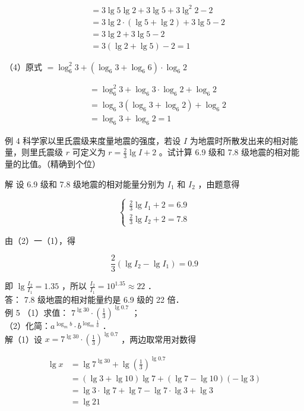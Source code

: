 \documentclass[10pt]{article}
\begin{document}
\[
\begin{aligned}
& =3 \lg 5 \lg 2+3 \lg 5+3 \lg ^{2} 2-2 \\
& =3 \lg 2 \cdot(\lg 5+\lg 2)+3 \lg 5-2 \\
& =3 \lg 2+3 \lg 5-2 \\
& =3(\lg 2+\lg 5)-2=1
\end{aligned}
\]

（4）原式 \(=\log _{6}^{2} 3+\left(\log _{6} 3+\log _{6} 6\right) \cdot \log _{6} 2\)

\[
\begin{aligned}
& =\log _{6}^{2} 3+\log _{6} 3 \cdot \log _{6} 2+\log _{6} 2 \\
& =\log _{6} 3\left(\log _{6} 3+\log _{6} 2\right)+\log _{6} 2 \\
& =\log _{6} 3+\log _{6} 2=1
\end{aligned}
\]

例 4 科学家以里氏震级来度量地震的强度，若设 \(I\) 为地震时所散发出来的相对能量，则里氏震级 \(r\) 可定义为 \(r=\frac{2}{3} \lg I+2\) 。试计算 6.9 级和 7.8 级地震的相对能量的比值。（精确到个位）

解 设 6.9 级和 7.8 级地震的相对能量分别为 \(I_{1}\) 和 \(I_{2}\) ，由题意得

\[
\left\{\begin{array}{l}
\frac{2}{3} \lg I_{1}+2=6.9 \\
\frac{2}{3} \lg I_{2}+2=7.8
\end{array}\right.
\]

由（2）一（1），得

\[
\frac{2}{3}\left(\lg I_{2}-\lg I_{1}\right)=0.9
\]

即 \(\lg \frac{I_{2}}{I_{1}}=1.35\) ，所以 \(\frac{I_{2}}{I_{1}}=10^{1.35} \approx 22\) ．\\
答： 7.8 级地震的相对能量约是 6.9 级的 22 倍．\\
例 5 （1）求值： \(7^{\lg 30} \cdot\left(\frac{1}{3}\right)^{\lg 0.7}\) ；\\
（2）化简：\(a^{\log _{m} b} \cdot b^{\log _{m} \frac{1}{a}}\) ．\\
解（1）设 \(x=7^{\lg 30} \cdot\left(\frac{1}{3}\right)^{\lg 0.7}\) ，两边取常用对数得

\[
\begin{aligned}
\lg x & =\lg 7^{\lg 30}+\lg \left(\frac{1}{3}\right)^{\lg 0.7} \\
& =(\lg 3+\lg 10) \lg 7+(\lg 7-\lg 10)(-\lg 3) \\
& =\lg 3 \cdot \lg 7+\lg 7-\lg 7 \cdot \lg 3+\lg 3 \\
& =\lg 21
\end{aligned}
\]
\end{document}
